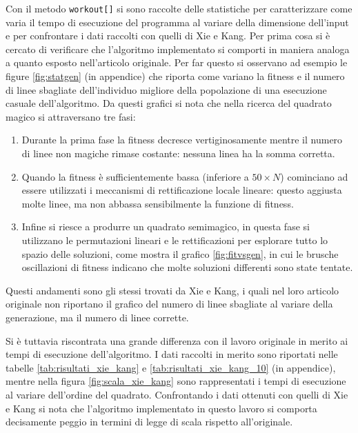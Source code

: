 \documentclass[italian,twoside,twocolumn]{article}
\begin{document}
Con il metodo \texttt{workout[]} si sono raccolte delle statistiche per caratterizzare come varia il tempo di esecuzione del programma al variare della dimensione dell'input e per confrontare i dati raccolti con quelli di Xie e Kang. Per prima cosa si è cercato di verificare che l'algoritmo implementato si comporti in maniera analoga a quanto esposto nell'articolo originale. Per far questo si osservano ad esempio le figure \ref{fig:statgen} (in appendice) che riporta come variano la fitness e il numero di linee sbagliate dell'individuo migliore della popolazione di una esecuzione casuale dell'algoritmo. Da questi grafici si nota che nella ricerca del quadrato magico si attraversano tre fasi:
\begin{enumerate}
	\item Durante la prima fase la fitness decresce vertiginosamente mentre il numero di linee non magiche rimase costante: nessuna linea ha la somma corretta.
	\item Quando la fitness è sufficientemente bassa (inferiore a $ 50 \times N $) cominciano ad essere utilizzati i meccanismi di rettificazione locale lineare: questo aggiusta molte linee, ma non abbassa sensibilmente la funzione di fitness.
	\item Infine si riesce a produrre un quadrato semimagico, in questa fase si utilizzano le permutazioni lineari e le rettificazioni per esplorare tutto lo spazio delle soluzioni, come mostra il grafico \ref{fig:fitvsgen}, in cui le brusche oscillazioni di fitness indicano che molte soluzioni differenti sono state tentate. 
\end{enumerate}
Questi andamenti sono gli stessi trovati da Xie e Kang, i quali nel loro articolo originale non riportano il grafico del numero di linee sbagliate al variare della generazione, ma il numero di linee corrette. 

Si è tuttavia riscontrata una grande differenza con il lavoro originale in merito ai tempi di esecuzione dell'algoritmo. I dati raccolti in merito sono riportati nelle tabelle \ref{tab:risultati_xie_kang} e \ref{tab:risultati_xie_kang_10} (in appendice), mentre nella figura \ref{fig:scala_xie_kang} sono rappresentati i tempi di esecuzione al variare dell'ordine del quadrato. Confrontando i dati ottenuti con quelli di Xie e Kang si nota che l'algoritmo implementato in questo lavoro si comporta decisamente peggio in termini di legge di scala rispetto all'originale. 
\end{document}
